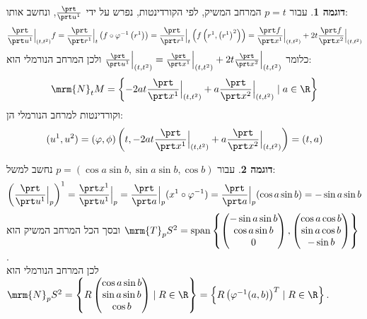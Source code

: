 \documentclass{article}
\theoremstyle{definition}
\newtheorem*{example*}{דוגמה}
\DeclareMathOperator{\spn}{span}
\begin{document}
	\begin{example*}
		עבור
		\(p=t\)
		המרחב המשיק, לפי הקורדינטות, נפרש על ידי
		\(\frac{\prt}{\prt u^1}\),
		ונחשב אותו:
		\[
			\frac{\prt}{\prt u^1}\Big|_{(t,t^2)} f
			=\frac{\prt}{\prt r^1}\Big|_t\left(f\circ\varphi^{-1}\left(r^1\right)\right)
			=\frac{\prt}{\prt r^1}\Big|_t\left(f\left(r^1,\left(r^1\right)^2\right)\right)
			=\frac{\prt f}{\prt x^1}\Big|_{(t,t^2)}+2t\frac{\prt f}{\prt x^2}\Big|_{(t,t^2)}
		\]
		כלומר
		\(
			\frac{\prt}{\prt u^1}\Big|_{(t,t^2)}
			=\frac{\prt}{\prt x^1}\Big|_{(t,t^2)}+2t\frac{\prt}{\prt x^2}\Big|_{(t,t^2)}
		\)
		ולכן המרחב הנורמלי הוא:
		\[
			\mrm{N}_t M
			= \left\{
				-2at\frac{\prt}{\prt x^1}\Big|_{(t,t^2)}+a\frac{\prt}{\prt x^2}\Big|_{(t,t^2)}
				\mid
				a \in \R
			\right\}
		\]
		וקורדינטות למרחב הנורמלי הן:
		\[
			(u^1,u^2)
			=\left(\varphi,\phi\right)\left(t,-2at\frac{\prt}{\prt x^1}\Big|_{(t,t^2)}+a\frac{\prt}{\prt x^2}\Big|_{(t,t^2)}\right)
			=(t,a)
		\]
	\end{example*}

	\begin{example*}
		עבור
		\(p=(\cos a \sin b, \sin a \sin b, \cos b)\)
		נחשב למשל:
		\[
			\left(\frac{\prt}{\prt u^1}\Big|_p\right)^1
			= \frac{\prt x^1}{\prt u^1}\Big|_p
			= \frac{\prt}{\prt a}\Big|_p (x^1 \circ \varphi^{-1})
			= \frac{\prt}{\prt a}\Big|_p (\cos a \sin b)
			= -\sin a \sin b
		\]
		ובסך הכל המרחב המשיק הוא
		\(
			\mrm{T}_p S^2
			= \spn\left\{
				\begin{pmatrix}
					-\sin a \sin b \\ \cos a \sin b \\ 0
				\end{pmatrix},
				\begin{pmatrix}
					\cos a \cos b \\ \sin a \cos b \\ -\sin b
				\end{pmatrix}
			\right\}
		\).
		\\
		לכן המרחב הנורמלי הוא
		\(
			\mrm{N}_p S^2
			= \left\{
				R
				\begin{pmatrix}
					\cos a \sin b \\ \sin a \sin b \\ \cos b
				\end{pmatrix}
				\mid
				R \in \R
			\right\}
			= \left\{
				R
				\left(\varphi^{-1}(a, b)\right)^T
				\mid
				R \in \R
			\right\}
		\).
	\end{example*}
\end{document}
